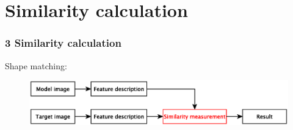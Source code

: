 \documentclass[notheorems,serif,table,compress]{beamer}  %
\begin{document}

\section{Similarity calculation}


\begin{frame}
\frametitle{3 Similarity calculation}
    Shape matching:
    \begin{tcolorbox}[colback=red!5,colframe=blue!75!black]
        \begin{figure}
            \includegraphics[width=1\linewidth]{matchChart2} 
        \end{figure}
    \end{tcolorbox}
\end{frame}
\end{document}
